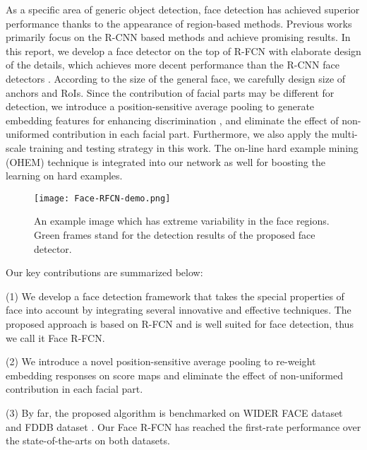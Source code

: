 \documentclass{article} \usepackage{nips13submit_e,times}
\newcommand{\ignore}[1]{}
\begin{document}
As a specific area of generic object detection, face detection has achieved superior\ignore{high} performance thanks to\ignore{due to} the appearance\ignore{applying } of region-based methods. Previous works primarily\ignore{mainly} focus on the R-CNN based methods and achieve\ignore{making for} promising results. In this report, we develop a face detector on the top of R-FCN with elaborate design of the details, which achieves more decent performance than the R-CNN face detectors \cite{facefrcnn, facercnn}. According to the size of the general face, we carefully design size of anchors and RoIs. Since \ignore{that} the contribution of facial parts may be different for detection, we introduce a position-sensitive average pooling to generate embedding features for enhancing discrimination \ignore{to inject embedding in the feature}, and eliminate\ignore{eliminating} the effect of non-uniformed contribution in each facial part\ignore{part}.
Furthermore, we also apply\ignore{employ and} the multi-scale training and testing strategy in this work. The on-line hard example mining (OHEM) technique \cite{OHEM} is\ignore{also adopted} integrated into our network as well for boosting the learning on hard examples.\ignore{improving performance}

 


\begin{figure}
  \centering
\texttt{[image: Face-RFCN-demo.png]}
  \caption{An example image which has extreme variability in the face regions. Green frames stand for the detection results of the proposed face detector.}\label{1}
\end{figure}

Our key contributions are summarized below:


(1) We develop a face detection framework that takes the special properties of face into account by integrating several innovative and effective \ignore{newly developed} techniques. The proposed approach is based on R-FCN and is well suited for face detection, thus we call it Face R-FCN.

(2) We introduce a novel position-sensitive average pooling to re-weight embedding responses on score maps and eliminate the effect of non-uniformed contribution in each facial part.

(3) By far, the proposed algorithm is benchmarked on WIDER FACE dataset \cite{wider} and FDDB dataset \cite{fddb}. Our Face R-FCN has reached the first-rate performance over the state-of-the-arts on both datasets.
\end{document}
